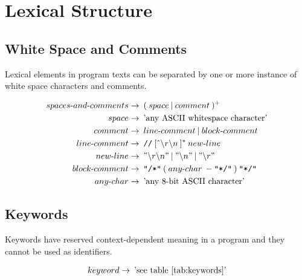 \documentclass[a4paper,oneside,11pt]{article}
\begin{document}
\section{Lexical Structure}

\subsection{White Space and Comments}

Lexical elements in program texts can be separated by one or more instance of white space characters and comments.

\begin{align*}
spaces\textrm{-}and\textrm{-}comments &\rightarrow \> (\> space \> | \> comment \>)^+\\
space &\rightarrow \> \textrm{'any ASCII whitespace character'}\\
comment &\rightarrow \> line\textrm{-}comment \> | \> block\textrm{-}comment\\
line\textrm{-}comment &\rightarrow \> \texttt{//} \> [\> \hat{} \> \backslash r\backslash n\>]^* \> new\textrm{-}line\\
new\textrm{-}line &\rightarrow \>  "\backslash r\backslash n" \>  | \> "\backslash n" \> | \> "\backslash r"\\
block\textrm{-}comment &\rightarrow \> \texttt{"/*"}\> ( \> any\textrm{-}char \> - \texttt{"*/"} \> ) \> \texttt{"*/"}\\
any\textrm{-}char &\rightarrow \> \textrm{'any 8-bit ASCII character'}
\end{align*}

\subsection{Keywords}\label{keyword}

Keywords have reserved context-dependent meaning in a program and they cannot be used as identifiers.

\begin{align*}
keyword \rightarrow \> \textrm{'see table \ref{tab:keywords}'}
\end{align*}
\end{document}
